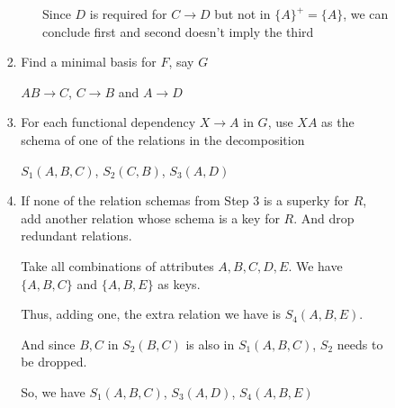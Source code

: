 \documentclass[12pt]{article}
\begin{document}
\begin{enumerate}[1.]
\begin{enumerate}[a)]
\begin{itemize}
\begin{enumerate}[1.]
\begin{enumerate}[1)]
                    Since $D$ is required for $C \to D$ but not in $\{A\}^+ = \{A\}$, we can conclude first
                    and second doesn't imply the third

                \end{enumerate}

                \color{black}


                \item Find a minimal basis for $F$, say $G$

                \bigskip

                \color{red}
                $AB \to C$, $C \to B$ and $A \to D$
                \color{black}

                \item For each functional dependency $X \to A$ in $G$, use $XA$
                as the schema of one of the relations in the decomposition

                \bigskip

                \color{red}
                $S_1(A,B,C)$, $S_2(C,B)$, $S_3(A,D)$
                \color{black}

                \bigskip

                \item If none of the relation schemas from Step 3 is a superky for $R$,
                add another relation whose schema is a key for $R$. And drop redundant relations.

                \bigskip

                \color{red}

                Take all combinations of attributes $A,B,C,D,E$. We have $\{A,B,C\}$ and
                $\{A,B,E\}$ as keys.

                \bigskip

                Thus, adding one, the extra relation we have is $S_4(A,B,E)$.

                \bigskip

                And since $B,C$ in $S_2(B,C)$ is also in $S_1(A,B,C)$, $S_2$ needs to be dropped.

                \bigskip

                So, we have $S_1(A,B,C)$, $S_3(A,D)$, $S_4(A,B,E)$

                \color{black}
            \end{enumerate}

        \end{itemize}


\end{enumerate}
\end{enumerate}
\end{document}
